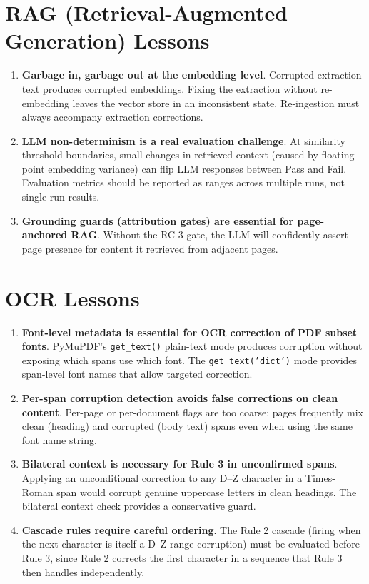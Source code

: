 \documentclass[12pt, a4paper]{report}
\newcommand{\codeinline}[1]{\texttt{#1}}
\begin{document}
\section{RAG (Retrieval-Augmented Generation) Lessons}

\begin{enumerate}
  \item \textbf{Garbage in, garbage out at the embedding level}. Corrupted
        extraction text produces corrupted embeddings. Fixing the extraction
        without re-embedding leaves the vector store in an inconsistent state.
        Re-ingestion must always accompany extraction corrections.

  \item \textbf{LLM non-determinism is a real evaluation challenge}. At
        similarity threshold boundaries, small changes in retrieved context
        (caused by floating-point embedding variance) can flip LLM responses
        between Pass and Fail. Evaluation metrics should be reported as ranges
        across multiple runs, not single-run results.

  \item \textbf{Grounding guards (attribution gates) are essential for
        page-anchored RAG}. Without the RC-3 gate, the LLM will confidently
        assert page presence for content it retrieved from adjacent pages.
\end{enumerate}

\section{OCR Lessons}

\begin{enumerate}
  \item \textbf{Font-level metadata is essential for OCR correction of PDF
        subset fonts}. PyMuPDF's \codeinline{get\_text()} plain-text mode
        produces corruption without exposing which spans use which font. The
        \codeinline{get\_text('dict')} mode provides span-level font names
        that allow targeted correction.

  \item \textbf{Per-span corruption detection avoids false corrections on
        clean content}. Per-page or per-document flags are too coarse: pages
        frequently mix clean (heading) and corrupted (body text) spans even
        when using the same font name string.

  \item \textbf{Bilateral context is necessary for Rule 3 in unconfirmed spans}.
        Applying an unconditional correction to any D--Z character in a
        Times-Roman span would corrupt genuine uppercase letters in clean
        headings. The bilateral context check provides a conservative guard.

  \item \textbf{Cascade rules require careful ordering}. The Rule 2 cascade
        (firing when the next character is itself a D--Z range corruption) must
        be evaluated before Rule 3, since Rule 2 corrects the first character
        in a sequence that Rule 3 then handles independently.
\end{enumerate}
\end{document}
